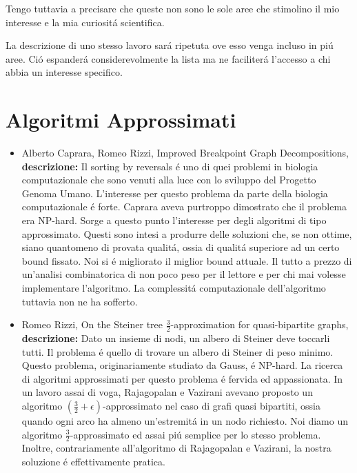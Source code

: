 \documentclass[10pt]{article}
\begin{document}
Tengo tuttavia a precisare che queste non sono
le sole aree che stimolino il mio
interesse e la mia curiosit\'a scientifica.

La descrizione di uno stesso lavoro
sar\'a ripetuta ove esso venga incluso in pi\'u aree.
Ci\'o espander\'a considerevolmente la lista
ma ne faciliter\'a l'accesso a chi abbia un interesse specifico.\\








\section{Algoritmi Approssimati}

\begin{itemize}
  \vspace{1.4mm}
  \item[] {\sc Alberto Caprara, Romeo Rizzi},
   \newblock  Improved Breakpoint Graph Decompositions,
   \\
{\bf descrizione:}
Il sorting by reversals \'e uno di quei
problemi in biologia computazionale
che sono venuti alla
luce con lo sviluppo del Progetto Genoma Umano.
L'interesse per questo problema da parte
della biologia computazionale \'e forte.
Caprara aveva purtroppo dimostrato che il problema
era NP-hard.
Sorge a questo punto l'interesse per degli algoritmi
di tipo approssimato.
Questi sono intesi a produrre delle soluzioni che, se non ottime,
siano quantomeno di provata qualit\'a,
ossia di qualit\'a superiore ad un certo bound fissato.
Noi si \'e migliorato il miglior
bound attuale.
Il tutto a prezzo di un'analisi combinatorica
di non poco peso per il lettore e per chi mai
volesse implementare l'algoritmo.
La complessit\'a computazionale dell'algoritmo
tuttavia non ne ha sofferto.\\

  \vspace{1.4mm}
  \item[] {\sc Romeo Rizzi},
   \newblock  On the Steiner tree $\frac{3}{2}$-approximation
              for quasi-bipartite graphs,
    \\
{\bf descrizione:}
Dato un insieme di nodi,
un albero di Steiner deve toccarli tutti.
Il problema \'e quello di trovare un albero
di Steiner di peso minimo.
Questo problema,
originariamente studiato da Gauss,
\'e NP-hard.
La ricerca di algoritmi approssimati
per questo problema \'e fervida ed appassionata.
In un lavoro assai di voga,
Rajagopalan e Vazirani avevano
proposto un algoritmo $(\frac{3}{2}+\epsilon)$-approssimato
nel caso di grafi quasi bipartiti,
ossia quando ogni arco ha almeno un'estremit\'a
in un nodo richiesto.
Noi diamo un algoritmo $\frac{3}{2}$-approssimato
ed assai pi\'u semplice per lo stesso problema.
Inoltre, contrariamente all'algoritmo di Rajagopalan e Vazirani,
la nostra soluzione \'e effettivamente pratica.\\


\end{itemize}
\end{document}
